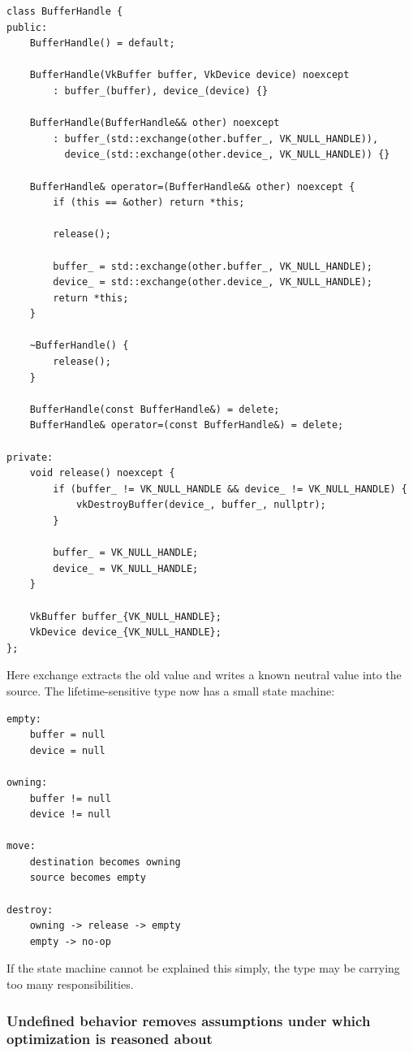 \begin{verbatim}
class BufferHandle {
public:
    BufferHandle() = default;

    BufferHandle(VkBuffer buffer, VkDevice device) noexcept
        : buffer_(buffer), device_(device) {}

    BufferHandle(BufferHandle&& other) noexcept
        : buffer_(std::exchange(other.buffer_, VK_NULL_HANDLE)),
          device_(std::exchange(other.device_, VK_NULL_HANDLE)) {}

    BufferHandle& operator=(BufferHandle&& other) noexcept {
        if (this == &other) return *this;

        release();

        buffer_ = std::exchange(other.buffer_, VK_NULL_HANDLE);
        device_ = std::exchange(other.device_, VK_NULL_HANDLE);
        return *this;
    }

    ~BufferHandle() {
        release();
    }

    BufferHandle(const BufferHandle&) = delete;
    BufferHandle& operator=(const BufferHandle&) = delete;

private:
    void release() noexcept {
        if (buffer_ != VK_NULL_HANDLE && device_ != VK_NULL_HANDLE) {
            vkDestroyBuffer(device_, buffer_, nullptr);
        }

        buffer_ = VK_NULL_HANDLE;
        device_ = VK_NULL_HANDLE;
    }

    VkBuffer buffer_{VK_NULL_HANDLE};
    VkDevice device_{VK_NULL_HANDLE};
};
\end{verbatim}

Here exchange extracts the old value and writes a known neutral value into the source. The lifetime-sensitive type now has a small state machine:

\begin{verbatim}
empty:
    buffer = null
    device = null

owning:
    buffer != null
    device != null

move:
    destination becomes owning
    source becomes empty

destroy:
    owning -> release -> empty
    empty -> no-op
\end{verbatim}

If the state machine cannot be explained this simply, the type may be carrying too many responsibilities.

\subsubsection{Undefined behavior removes assumptions under which optimization is reasoned about}\label{01-foundations-i-ch005-undefined-behavior-removes-assumptions-under-which-optimization-is-reasoned-about}

